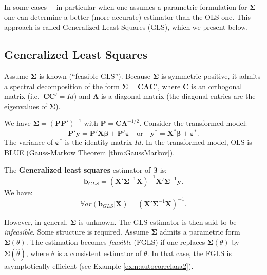 \documentclass[
  12pt,
]{book}
\theoremstyle{definition}
\theoremstyle{definition}
\theoremstyle{definition}
\theoremstyle{definition}
\theoremstyle{remark}
\begin{document}
In some cases ---in particular when one assumes a parametric formulation for \(\boldsymbol\Sigma\)--- one can determine a better (more accurate) estimator than the OLS one. This approach is called Generalized Least Squares (GLS), which we present below.

\hypertarget{GLS}{%
\subsection{Generalized Least Squares}\label{GLS}}

Assume \(\boldsymbol\Sigma\) is known (``feasible GLS''). Because \(\boldsymbol\Sigma\) is symmetric positive, it admits a spectral decomposition of the form \(\boldsymbol\Sigma = \mathbf{C} \boldsymbol\Lambda \mathbf{C}'\), where \(\mathbf{C}\) is an orthogonal matrix (i.e.~\(\mathbf{C}\mathbf{C}'=Id\)) and \(\boldsymbol\Lambda\) is a diagonal matrix (the diagonal entries are the eigenvalues of \(\boldsymbol\Sigma\)).

We have \(\boldsymbol\Sigma = (\mathbf{P}\mathbf{P}')^{-1}\) with \(\mathbf{P} = \mathbf{C}\boldsymbol\Lambda^{-1/2}\). Consider the transformed model:
\[
\mathbf{P}'\mathbf{y} = \mathbf{P}'\mathbf{X}\boldsymbol\beta + \mathbf{P}'\boldsymbol\varepsilon \quad \mbox{or} \quad \mathbf{y}^* = \mathbf{X}^*\boldsymbol\beta + \boldsymbol\varepsilon^*.
\]
The variance of \(\boldsymbol\varepsilon^*\) is the identity matrix \(Id\). In the transformed model, OLS is BLUE (Gauss-Markow Theorem \ref{thm:GaussMarkov}).

The \textbf{Generalized least squares} estimator of \(\boldsymbol\beta\) is:
\begin{equation}
\boxed{\mathbf{b}_{GLS} = (\mathbf{X}'\boldsymbol\Sigma^{-1}\mathbf{X})^{-1}\mathbf{X}'\boldsymbol\Sigma^{-1}\mathbf{y}.}\label{eq:betaGLS}
\end{equation}
We have:
\[
\mathbb{V}ar(\mathbf{b}_{GLS}|\mathbf{X}) = (\mathbf{X}'\boldsymbol\Sigma^{-1}\mathbf{X})^{-1}.
\]

However, in general, \(\boldsymbol\Sigma\) is unknown. The GLS estimator is then said to be \emph{infeasible}. Some structure is required. Assume \(\boldsymbol\Sigma\) admits a parametric form \(\boldsymbol\Sigma(\theta)\). The estimation becomes \emph{feasible} (FGLS) if one replaces \(\boldsymbol\Sigma(\theta)\) by \(\boldsymbol\Sigma(\hat\theta)\), where \(\hat\theta\) is a consistent estimator of \(\theta\). In that case, the FGLS is asymptotically efficient (see Example \ref{exm:autocorrelaaa2}).
\end{document}
